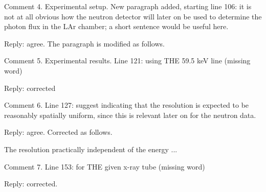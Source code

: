 \documentclass[page-classic]{epl2}
\begin{document}
\vspace{0.5 cm}

Comment 4. Experimental setup. New paragraph added, starting line
106:  it is not at all obvious how the neutron detector will later
on be used to determine the photon flux in the LAr chamber; a short
sentence would be useful here.

\vspace{0.5 cm}

Reply: agree. The paragraph is modified as follows.

\vspace{0.5 cm}



\vspace{0.5 cm}

Comment 5. Experimental results. Line 121: using THE 59.5 keV line (missing word)

\vspace{0.5 cm}

Reply: corrected

\vspace{0.5 cm}

Comment 6. Line 127: suggest indicating that the resolution is
expected to be reasonably spatially uniform, since this is relevant
later on for the neutron data.

\vspace{0.5 cm}

Reply: agree. Corrected as follows.

\vspace{0.5 cm}

The resolution  practically independent of the energy ...

\vspace{0.5 cm}

Comment 7. Line 153: for THE given x-ray tube (missing word)

\vspace{0.5 cm}

Reply: corrected.

\vspace{0.5 cm}
\end{document}
